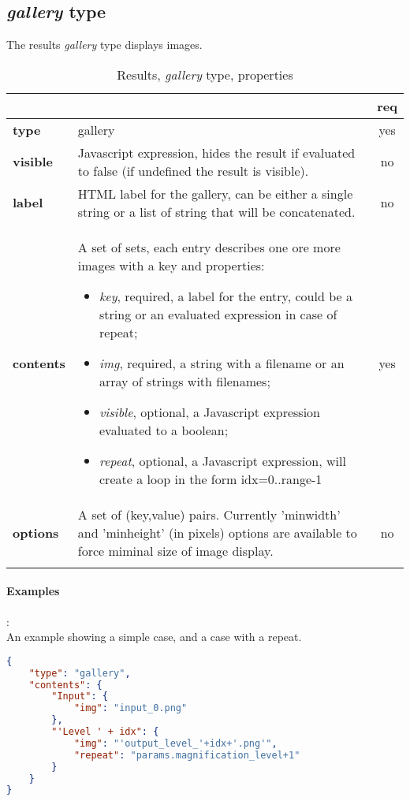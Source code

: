 \subsection{ \emph{gallery} type}

The results \emph{gallery} type displays images.

\begin{longtable}{|>{\bf}L{\linewidth}|L{\linewidth}|c|}
\hline
      &  & {\bf req} 
\tabularnewline \hline \hline
 type       & gallery  & yes \\ \hline
 visible    & Javascript expression, hides the result if
              evaluated to false (if undefined the result is visible).& no \\ \hline
 label      & HTML label for the gallery, can be either a single string or 
             a list of string that will be concatenated. & no \\ \hline
 contents   & A set of sets, each entry describes one ore more images with a key and properties:
\vspace{-1em}
\begin{itemize}
    \setlength\itemsep{-0.5em}
    \item \textit{key}, required, a label for the entry, could be a string or an evaluated expression in case of repeat;
    \item \textit{img}, required, a string with a filename or an array of strings with filenames;
    \item \textit{visible}, optional, a Javascript expression evaluated to a boolean;
    \item \textit{repeat}, optional, a Javascript expression, will create a loop in the form idx=0..range-1
\end{itemize} 
\vspace{-1em} & yes \\ \hline
 options    & A set of (key,value) pairs. Currently
              'minwidth' and 'minheight' (in pixels) options are available to force
              miminal size of image display. & no \\ \hline
\caption{Results, \emph{gallery} type, properties}
\end{longtable}

\paragraph{Examples}:\\
An example showing a simple case, and a case with a repeat.
\begin{lstlisting}[language=json,firstnumber=1]
{
  	"type": "gallery",
    "contents": {
        "Input": {
            "img": "input_0.png"
        },
        "'Level ' + idx": {
            "img": "'output_level_'+idx+'.png'",
            "repeat": "params.magnification_level+1"
        }
    }
}
\end{lstlisting}


